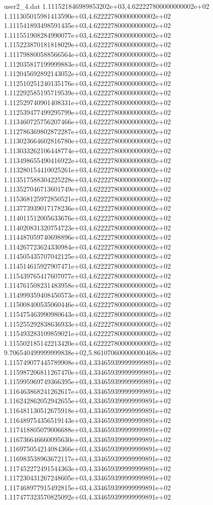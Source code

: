 \begin{filecontents}{user2_4.dat}
1.111521846989853202e+03,4.622227800000000002e+02
1.111305015981413590e+03,4.622227800000000002e+02
1.111541893498591435e+03,4.622227800000000002e+02
1.111551908284990077e+03,4.622227800000000002e+02
1.115223870181818029e+03,4.622227800000000002e+02
1.111798800588566564e+03,4.622227800000000002e+02
1.112035817199999883e+03,4.622227800000000002e+02
1.112045692892143052e+03,4.622227800000000002e+02
1.112510251240135176e+03,4.622227800000000002e+02
1.112292585195719539e+03,4.622227800000000002e+02
1.112529740901408331e+03,4.622227800000000002e+02
1.112539477499295799e+03,4.622227800000000002e+02
1.113460725756207466e+03,4.622227800000000002e+02
1.112786369802872287e+03,4.622227800000000002e+02
1.113023664602816780e+03,4.622227800000000002e+02
1.113033262106448774e+03,4.622227800000000002e+02
1.113498655490416922e+03,4.622227800000000002e+02
1.113280154410025261e+03,4.622227800000000002e+02
1.113517588304225228e+03,4.622227800000000002e+02
1.113527046713601749e+03,4.622227800000000002e+02
1.115368125972850521e+03,4.622227800000000002e+02
1.113773939017178236e+03,4.622227800000000002e+02
1.114011512005633676e+03,4.622227800000000002e+02
1.114020831320754723e+03,4.622227800000000002e+02
1.114487059740698896e+03,4.622227800000000002e+02
1.114267723624330984e+03,4.622227800000000002e+02
1.114505435707042125e+03,4.622227800000000002e+02
1.114514615927907471e+03,4.622227800000000002e+02
1.115439765417607077e+03,4.622227800000000002e+02
1.114761508231483958e+03,4.622227800000000002e+02
1.114999359408450573e+03,4.622227800000000002e+02
1.115008400535060446e+03,4.622227800000000002e+02
1.115475463990980643e+03,4.622227800000000002e+02
1.115255292838636933e+03,4.622227800000000002e+02
1.115493283109859021e+03,4.622227800000000002e+02
1.115502185142213420e+03,4.622227800000000002e+02
9.706540499999999838e+02,5.861070600000000468e+02
1.115749077445789908e+03,4.334659399999999891e+02
1.115987206811267470e+03,4.334659399999999891e+02
1.115995969749366395e+03,4.334659399999999891e+02
1.116463868241262617e+03,4.334659399999999891e+02
1.116242862052942655e+03,4.334659399999999891e+02
1.116481130512675918e+03,4.334659399999999891e+02
1.116489754356519143e+03,4.334659399999999891e+02
1.117418805079006688e+03,4.334659399999999891e+02
1.116736646660095630e+03,4.334659399999999891e+02
1.116975054214084366e+03,4.334659399999999891e+02
1.116983538963672117e+03,4.334659399999999891e+02
1.117452272491544363e+03,4.334659399999999891e+02
1.117230431267248605e+03,4.334659399999999891e+02
1.117468977915492815e+03,4.334659399999999891e+02
1.117477323570825092e+03,4.334659399999999891e+02

\end{filecontents}
